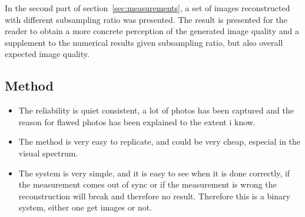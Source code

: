 In the second part of section~\ref{sec:measurements}, a set of images reconstructed with different subsampling ratio was presented. The result is presented for the reader to obtain a more concrete perception of the generated image quality and a supplement to the numerical results given subsampling ratio, but also overall expected image quality.

\subsection{Method} %






\begin{itemize}
\item The reliability is quiet consistent, a lot of photos has been captured and the reason for flawed photos has been explained to the extent i know.

\item The method is very easy to replicate, and could be very cheap, especial in the visual spectrum. 
\end{itemize}

\begin{itemize}
\item The system is very simple, and it is easy to see when it is done correctly, if the measurement comes out of sync or if the measurement is wrong the reconstruction will break and therefore no result. Therefore this is a binary system, either one get images or not.
\end{itemize}

